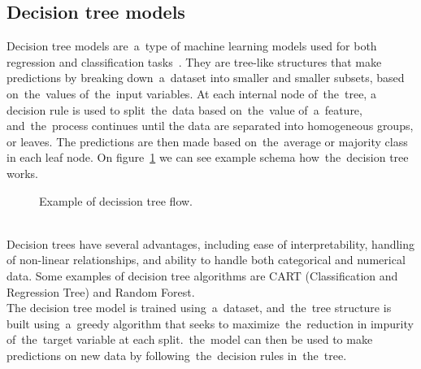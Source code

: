 \subsection{Decision tree models}\label{sec:trees}
Decision tree models are~a~type of machine learning models used for both regression and classification
tasks~\cite{Kotsiantis}. They are tree-like structures that make predictions by breaking down~a~dataset into
smaller and smaller subsets, based on~the~values of~the~input variables. At each internal node of~the~tree,
a decision rule is used to split~the~data based on~the~value of~a~feature, and~the~process continues until the
data are separated into homogeneous groups, or leaves.
The predictions are then made based on~the~average or majority class in each leaf node. On figure~\ref{fig:example_tree} we can see example schema how~the~decision tree works.\\
\begin{figure}
    \centering
    \caption{Example of decission tree flow.}\label{fig:example_tree}
\end{figure}
\\
Decision trees have several advantages, including ease of interpretability, handling of non-linear relationships,
and ability to handle both categorical and numerical data. Some examples of decision tree algorithms are CART
(Classification and Regression Tree) and Random Forest.
\\
The decision tree model is trained using~a~dataset, and~the~tree structure is built using~a~greedy algorithm
that seeks to maximize~the~reduction in impurity of~the~target variable at each split.~the~model can then be used
to make predictions on new data by following~the~decision rules in~the~tree.
